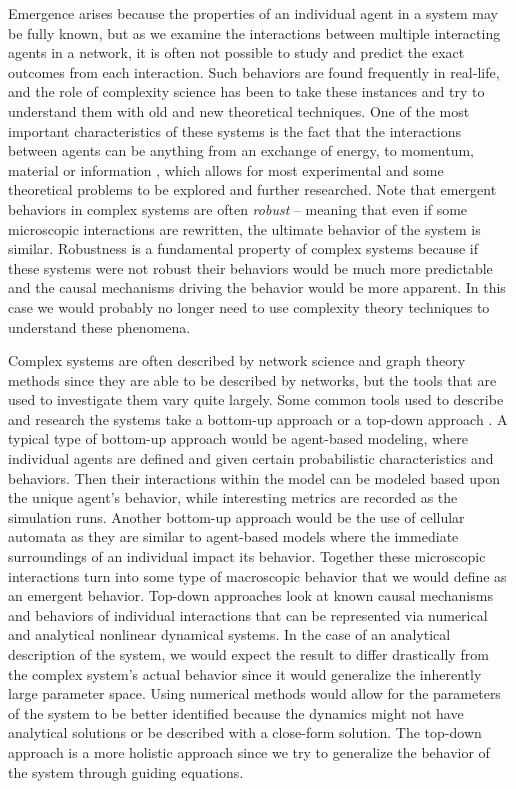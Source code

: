 Emergence arises because the properties of an individual agent in a system may be fully known, but as we examine the interactions between multiple interacting agents in a network, it is often not possible to study and predict the exact outcomes from each interaction. Such behaviors are found frequently in real-life, and the role of complexity science has been to take these instances and try to understand them with old and new theoretical techniques. One of the most important characteristics of these systems is the fact that the interactions between agents can be anything from an exchange of energy, to momentum, material or information \citep{Werner1999}, which allows for most experimental and some theoretical problems to be explored and further researched. Note that emergent behaviors in complex systems are often \textit{robust} -- meaning that even if some microscopic interactions are rewritten, the ultimate behavior of the system is similar. Robustness is a fundamental property of complex systems because if these systems were not robust their behaviors would be much more predictable and the causal mechanisms driving the behavior would be more apparent. In this case we would probably no longer need to use complexity theory techniques to understand these phenomena. 

Complex systems are often described by network science and graph theory methods since they are able to be described by networks, but the tools that are used to investigate them vary quite largely. Some common tools used to describe and research the systems take a bottom-up approach or a top-down approach \citep{Mhamdi2018}. A typical type of bottom-up approach would be agent-based modeling, where individual agents are defined and given certain probabilistic characteristics and behaviors. Then their interactions within the model can be modeled based upon the unique agent's behavior, while interesting metrics are recorded as the simulation runs. Another bottom-up approach would be the use of cellular automata as they are similar to agent-based models where the immediate surroundings of an individual impact its behavior. Together these microscopic interactions turn into some type of macroscopic behavior that we would define as an emergent behavior. Top-down approaches look at known causal mechanisms and behaviors of individual interactions that can be represented via numerical and analytical nonlinear dynamical systems. In the case of an analytical description of the system, we would expect the result to differ drastically from the complex system's actual behavior since it would generalize the inherently large parameter space. Using numerical methods would allow for the parameters of the system to be better identified because the dynamics might not have analytical solutions or be described with a close-form solution. The top-down approach is a more holistic approach since we try to generalize the behavior of the system through guiding equations.



